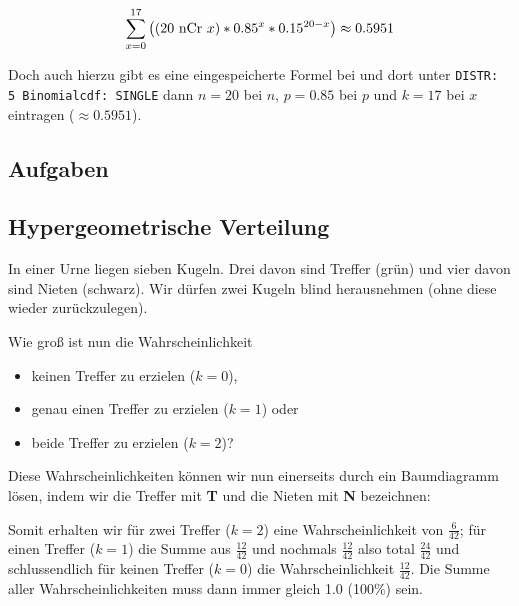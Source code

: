 $$\sum_{x=0}^{17}\left(( 20 \textrm{\,\,nCr\,\,} x ) * 0.85^x *
0.15^{20-x}\right) \approx 0.5951$$


Doch auch hierzu gibt es eine eingespeicherte Formel
bei
 und dort unter \texttt{DISTR: 5
  Binomialcdf: SINGLE} dann $n=20$ bei $n$, $p=0.85$ bei $p$ und
$k=17$ bei $x$ eintragen ($\approx 0.5951$).



\subsection*{Aufgaben}

\newpage



\subsection{Hypergeometrische Verteilung}
In einer Urne liegen sieben Kugeln. Drei davon sind Treffer (grün) und vier davon sind Nieten (schwarz).
Wir dürfen zwei Kugeln blind herausnehmen (ohne diese wieder zurückzulegen).


Wie groß ist nun die Wahrscheinlichkeit
\begin{itemize}
\item keinen Treffer zu erzielen ($k=0$),
\item genau einen Treffer zu erzielen ($k=1$) oder
\item beide Treffer zu erzielen ($k=2$)?
\end{itemize}

Diese Wahrscheinlichkeiten können wir nun einerseits durch ein Baumdiagramm lösen, indem wir die Treffer mit \textbf{\color{green}T} und die Nieten mit \textbf{\color{red}N} bezeichnen:


Somit erhalten wir für zwei Treffer ($k=2$) eine Wahrscheinlichkeit von $\frac{6}{42}$; für einen Treffer ($k=1$) die Summe aus $\frac{12}{42}$ und nochmals $\frac{12}{42}$ also total $\frac{24}{42}$ und schlussendlich für keinen Treffer ($k=0$) die Wahrscheinlichkeit $\frac{12}{42}$.
Die Summe aller Wahrscheinlichkeiten muss dann immer gleich 1.0 (100\%) sein.
\newpage



